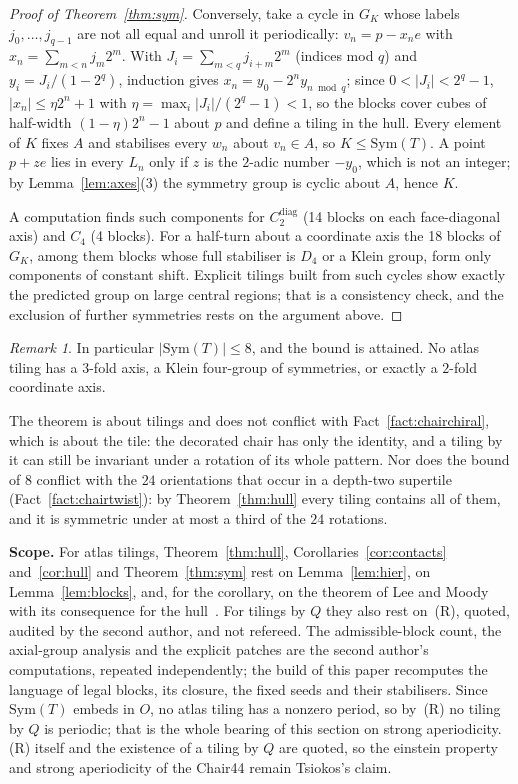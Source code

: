 \documentclass[11pt]{article}
\theoremstyle{definition}
\theoremstyle{remark}
\newtheorem{remark}{Remark}
\begin{document}
\begin{proof}[Proof of Theorem~\ref{thm:sym}]
Conversely, take a cycle in $G_{K}$ whose labels $j_{0},\dots,j_{q-1}$ are not all equal and unroll it periodically:
$v_{n}=p-x_{n}e$ with $x_{n}=\sum_{m<n}j_{m}2^{m}$.  With $J_{i}=\sum_{m<q}j_{i+m}2^{m}$ (indices mod $q$) and
$y_{i}=J_{i}/(1-2^{q})$, induction gives $x_{n}=y_{0}-2^{n}y_{n\bmod q}$; since $0<|J_{i}|<2^{q}-1$, $|x_{n}|\le\eta2^{n}+1$ with
$\eta=\max_{i}|J_{i}|/(2^{q}-1)<1$, so the blocks cover cubes of half-width $(1-\eta)2^{n}-1$ about $p$ and define a tiling in
the hull.  Every element of $K$ fixes $A$ and stabilises every $w_{n}$ about $v_{n}\in A$, so $K\le\mathrm{Sym}(T)$.  A point
$p+ze$ lies in every $L_{n}$ only if $z$ is the $2$-adic number $-y_{0}$, which is not an integer; by
Lemma~\ref{lem:axes}(3) the symmetry group is cyclic about $A$, hence $K$.

A computation finds such components for $C_{2}^{\mathrm{diag}}$ (14 blocks on each face-diagonal axis) and $C_{4}$
(4 blocks).  For a half-turn about a coordinate axis the 18 blocks of $G_{K}$, among them blocks whose full stabiliser is
$D_{4}$ or a Klein group, form only components of constant shift.  Explicit tilings built from such cycles show exactly the
predicted group on large central regions; that is a consistency check, and the exclusion of further symmetries rests on the
argument above.
\end{proof}

\begin{remark}
\label{rem:order8}
In particular $|\mathrm{Sym}(T)|\le8$, and the bound is attained.  No atlas tiling has a $3$-fold axis, a Klein
four-group of symmetries, or exactly a $2$-fold coordinate axis.
\end{remark}

\noindent
The theorem is about tilings and does not conflict with Fact~\ref{fact:chairchiral}, which is about the tile: the
decorated chair has only the identity, and a tiling by it can still be invariant under a rotation of its whole pattern.
Nor does the bound of $8$ conflict with the $24$ orientations that occur in a depth-two supertile
(Fact~\ref{fact:chairtwist}): by Theorem~\ref{thm:hull} every tiling contains all of them, and it is symmetric under
at most a third of the $24$ rotations.

\textbf{Scope.}  For atlas tilings, Theorem~\ref{thm:hull}, Corollaries~\ref{cor:contacts} and~\ref{cor:hull} and
Theorem~\ref{thm:sym} rest on Lemma~\ref{lem:hier}, on Lemma~\ref{lem:blocks}, and, for the
corollary, on the theorem of Lee and Moody~\cite{LeeMoody} with its consequence for the hull~\cite{LMS}.  For tilings by $Q$ they also rest on~(R), quoted, audited by the
second author, and not refereed.  The admissible-block
count, the axial-group analysis and the explicit patches are the second author's computations, repeated independently; the
build of this paper recomputes the language of legal blocks, its closure, the fixed seeds and their stabilisers.  Since
$\mathrm{Sym}(T)$ embeds in $O$, no atlas tiling has a nonzero period, so by~(R) no tiling by $Q$ is periodic; that is the
whole bearing of this section on strong aperiodicity.  (R) itself and the existence of a tiling by $Q$ are quoted, so the
einstein property and strong aperiodicity of the Chair44 remain Tsiokos's claim.
\end{document}
